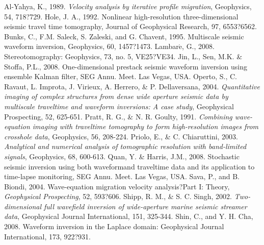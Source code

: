 \documentclass[mreferee]{gji}
\begin{document}
\begin{thebibliography}{}
 Al-Yahya, K., 1989. \textit{Velocity analysis by iterative profile migration}, Geophysics, 54, 718?729.
 Hole, J. A., 1992. Nonlinear high-resolution three-dimensional seismic travel time tomography, Journal of Geophysical Research, 97, 6553?6562.
 Bunks, C., F.M. Saleck, S. Zaleski, and G. Chavent, 1995. Multiscale seismic waveform inversion,  Geophysics, 60, 1457?1473.
 Lambar$\acute{\textrm{e}}$, G., 2008. Stereotomography: Geophysics, 73, no. 5, VE25?VE34.
 Jin, L., Sen, M.K. \& Stoffa, P.L., 2008. One-dimensional prestack seismic waveform inversion using ensemble Kalman filter, SEG Annu. Meet. Las Vegas, USA.
 Operto, S., C. Ravaut, L. Improta, J. Virieux, A. Herrero, \& P. Dellaversana, 2004. \textit{Quantitative imaging of complex structures from dense wide aperture seismic data by multiscale traveltime and waveform inversions: A case study}, Geophysical Prospecting, 52, 625-651.
 Pratt, R. G., \& N. R. Goulty, 1991. \textit{Combining wave-equation imaging with traveltime tomography to form high-resolution images from crosshole data}, Geophysics, 56, 208-224.
 Priolo, E., \& C. Chiaruttini, 2003. \textit{Analytical and numerical analysis of tomographic resolution with band-limited signals}, Geophysics, 68, 600-613.
 Quan, Y. \& Harris, J.M., 2008. Stochastic seismic inversion using both waveformand traveltime data and its application to time-lapse monitoring, SEG Annu. Meet. Las Vegas, USA.
 Sava, P., and B. Biondi, 2004. Wave-equation migration velocity analysis?Part I: Theory, \textit{Geophysical Prospecting}, 52, 593?606.
 Shipp, R. M., \& S. C. Singh, 2002. \textit{Two-dimensional full wavefield inversion of wide-aperture marine seismic streamer data}, Geophysical Journal International, 151, 325-344.
 Shin, C., and Y. H. Cha, 2008. Waveform inversion in the Laplace domain: Geophysical Journal International, 173, 922?931. 

\end{thebibliography}
\end{document}
